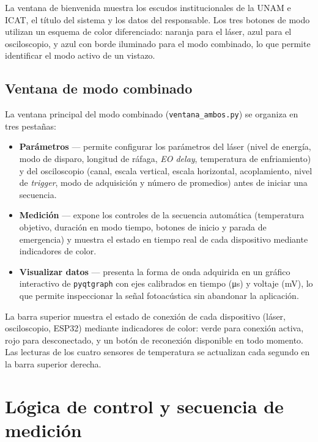 La ventana de bienvenida muestra los escudos institucionales de la
UNAM e ICAT, el título del sistema y los datos del responsable.
Los tres botones de modo utilizan un esquema de color diferenciado:
naranja para el láser, azul para el osciloscopio, y azul con borde
iluminado para el modo combinado, lo que permite identificar el modo
activo de un vistazo.

\subsection*{Ventana de modo combinado}

La ventana principal del modo combinado (\texttt{ventana\_ambos.py})
se organiza en tres pestañas:

\begin{itemize}
    \item \textbf{Parámetros} — permite configurar los parámetros del
    láser (nivel de energía, modo de disparo, longitud de ráfaga,
    \textit{EO delay}, temperatura de enfriamiento) y del osciloscopio
    (canal, escala vertical, escala horizontal, acoplamiento, nivel de
    \textit{trigger}, modo de adquisición y número de promedios)
    antes de iniciar una secuencia.

    \item \textbf{Medición} — expone los controles de la secuencia
    automática (temperatura objetivo, duración en modo tiempo,
    botones de inicio y parada de emergencia) y muestra el estado
    en tiempo real de cada dispositivo mediante indicadores de color.

    \item \textbf{Visualizar datos} — presenta la forma de onda
    adquirida en un gráfico interactivo de \texttt{pyqtgraph} con
    ejes calibrados en tiempo (\si{\micro\second}) y voltaje
    (\si{\milli\volt}), lo que permite inspeccionar la señal
    fotoacústica sin abandonar la aplicación.
\end{itemize}

La barra superior muestra el estado de conexión de cada dispositivo
(láser, osciloscopio, ESP32) mediante indicadores de color: verde
para conexión activa, rojo para desconectado, y un botón de
reconexión disponible en todo momento. Las lecturas de los cuatro
sensores de temperatura se actualizan cada segundo en la barra
superior derecha.

\section{Lógica de control y secuencia de medición}
\label{sec:logica_control}

